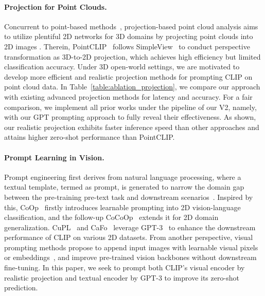 \documentclass[10pt,twocolumn,letterpaper]{article}
\begin{document}
\paragraph{Projection for Point Clouds.}
Concurrent to point-based methods~\cite{qi2016pointnet, qi2017pointnet++,  ma2022rethinking}, projection-based point cloud analysis aims to utilize plentiful 2D networks for 3D domains by projecting point clouds into 2D images \cite{su2015multi, Shi2015DeepPano, yang2019learning, wang2019dominant, wei2020view, ahmed2019epn}. 
Therein, PointCLIP~\cite{zhang2022pointclip} follows SimpleView~\cite{goyal2021revisiting} to conduct perspective transformation as 3D-to-2D projection, which achieves high efficiency but limited classification accuracy. 
Under 3D open-world settings, we are motivated to develop more efficient and realistic projection methods for prompting CLIP on point cloud data. In Table~\ref{table:ablation_projection}, we compare our approach with existing advanced projection methods for latency and accuracy. For a fair comparison, we implement all prior works under the pipeline of our V2, namely, with our GPT prompting approach to fully reveal their effectiveness. As shown, our realistic projection exhibits faster inference speed than other approaches and attains higher zero-shot performance than PointCLIP.

\paragraph{Prompt Learning in Vision.}
Prompt engineering first derives from natural language processing, where a textual template, termed as prompt, is generated to narrow the domain gap between the pre-training pre-text task and downstream scenarios~\cite{liu2021pre,Jiang2020How,wallace2019universal,Jiang2020How}. Inspired by this, CoOp~\cite{zhou2022coop} firstly introduces learnable prompting into 2D vision-language classification, and the follow-up CoCoOp~\cite{zhou2022cocoop} extends it for 2D domain generalization. CuPL~\cite{pratt2022Whatdoes} and CaFo~\cite{zhang2023prompt} leverage GPT-3~\cite{brown2020language} to enhance the downstream performance of CLIP on various 2D datasets. From another perspective, visual prompting methods propose to append input images with learnable visual pixels~\cite{jia2022visual, bahng2022visual, chen2022visual, gan2023decorate} or embeddings~\cite{jia2022visual,guo2023viewrefer,zhang2023personalize}, and improve pre-trained vision backbones without downstream fine-tuning. In this paper, we seek to prompt both CLIP's visual encoder by realistic projection and textual encoder by GPT-3 to improve its zero-shot prediction. 
\end{document}

